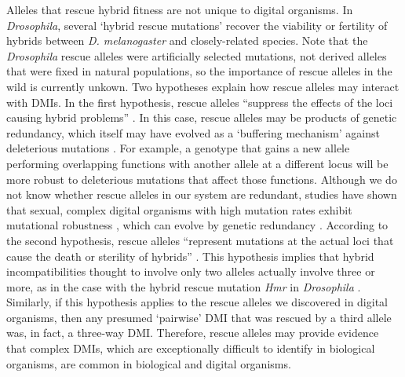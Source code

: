 \begin{doublespace}
Alleles that rescue hybrid fitness are not unique to digital organisms.
%
In \emph{Drosophila}, several `hybrid rescue mutations'
recover the viability or fertility
of hybrids between \emph{D. melanogaster} and closely-related species.
%
Note that the \emph{Drosophila} rescue alleles
were artificially selected mutations,
not derived alleles that were fixed in natural populations,
so the importance of rescue alleles in the wild is currently unkown.
%
Two hypotheses explain how rescue alleles
may interact with DMIs.
%
In the first hypothesis, rescue alleles
``suppress the effects of the loci causing hybrid problems'' \citep{coy04}.
%
In this case, rescue alleles may be products of genetic redundancy,
which itself may have evolved as a `buffering mechanism'
against deleterious mutations \citep{wag99,ele06}.
%
For example, a genotype that gains a new allele performing
overlapping functions with another allele at a different locus
will be more robust to deleterious mutations that affect those functions.
%
Although we do not know whether rescue alleles in our system are redundant,
studies have shown that sexual, complex digital organisms
with high mutation rates exhibit mutational robustness \citep{len99,wil01,mis06},
which can evolve by genetic redundancy \citep{ele07}.
%
According to the second hypothesis, rescue alleles
``represent mutations at the actual loci
that cause the death or sterility of hybrids'' \citep{coy04}.
%
This hypothesis implies that hybrid incompatibilities
thought to involve only two alleles actually involve three or more,
as in the case with the hybrid rescue mutation
\emph{Hmr} in \emph{Drosophila} \citep{bar00,orr00}.
%
Similarly, if this hypothesis applies
to the rescue alleles we discovered in digital organisms,
then any presumed `pairwise' DMI that was rescued by a third allele
was, in fact, a three-way DMI.
%
Therefore, rescue alleles may provide evidence that complex DMIs,
which are exceptionally difficult to identify in biological organisms,
are common in biological and digital organisms.



\end{doublespace}
